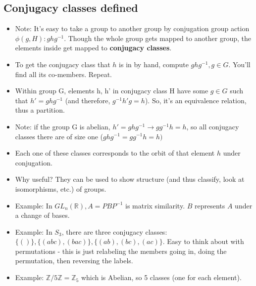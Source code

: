 \documentclass[11pt, oneside]{article}   	%
\begin{document}
\subsection{Conjugacy classes defined}
\begin{itemize}
\item Note: It's easy to take a group to another group by conjugation group action $\phi(g, H): ghg^{-1}$.  Though the whole group gets mapped to another group, the elements inside get mapped to \textbf{conjugacy classes}. 
\item To get the conjugacy class that $h$ is in by hand, compute $ghg^{-1}, g \in G$.  You'll find all its co-members.  Repeat.
\item Within group G, elements h, h' in conjugacy class H have some $g \in G$ such that $h' = ghg^{-1}$ (and therefore,  $g^{-1}h'g = h$).  So, it's an equivalence relation, thus a partition.
\item Note: if the group G is abelian, $h' = ghg^{-1} \rightarrow gg^{-1} h = h$, so all conjugacy classes there are of size one ($ghg^{-1} = gg^{-1}h = h)$
\item Each one of these classes corresponds to the orbit of that element $h$ under conjugation.  
\item Why useful?  They can be used to show structure (and thus classify, look at isomorphisms, etc.) of groups.
\item Example: In $GL_n(\mathbb{R}), A = PBP^{-1}$ is matrix similarity.  $B$ represents $A$ under a change of bases.
\item Example: In $S_3$, there are three conjugacy classes: $\{()\}, \{(abc), (bac)\}, \{(ab), (bc), (ac)\}$.  Easy to think about with permutations - this is just relabeling the members going in, doing the permutation, then reversing the labels.
\item Example: $\mathbb{Z} / 5\mathbb{Z} = \mathbb{Z}_5$ which is Abelian, so 5 classes (one for each element).
\end{itemize}
\end{document}
